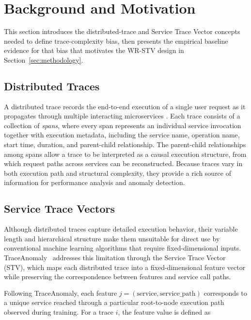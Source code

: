 \documentclass[informatics,article,submit,moreauthors]{Definitions/mdpi}
\newcommand{\rev}[1]{{\color{revisionblue}#1}}
\begin{document}

\section{Background and Motivation}
\label{sec:background}

\rev{This section introduces the distributed-trace and Service Trace Vector
concepts needed to define trace-complexity bias, then presents the
empirical baseline evidence for that bias that motivates the WR-STV
design in Section~\ref{sec:methodology}.}

\subsection{Distributed Traces}

A distributed trace records the end-to-end execution of a single user
request as it propagates through multiple interacting microservices
\cite{sigelman2010dapper}. Each trace consists of a collection of
\emph{spans}, where every span represents an individual service
invocation together with execution metadata, including the service name,
operation name, start time, duration, and parent-child relationship. The
parent-child relationships among spans allow a trace to be interpreted as
a causal execution structure, from which request paths across services
can be reconstructed. Because traces vary in both execution path and
structural complexity, they provide a rich source of information for
performance analysis and anomaly detection.

\subsection{Service Trace Vectors}

Although distributed traces capture detailed execution behavior, their
variable length and hierarchical structure make them unsuitable for
direct use by conventional machine learning algorithms that require
fixed-dimensional inputs. TraceAnomaly~\cite{liu2020traceanomaly}
addresses this limitation through the Service Trace Vector (STV), which
maps each distributed trace into a fixed-dimensional feature vector while
preserving the correspondence between features and service call paths.

Following TraceAnomaly, each feature
$j=(\mathrm{service},\mathrm{service\_path})$ corresponds to a unique service reached through a particular root-to-node execution path observed during training.
For a trace \(i\), the feature value is defined as
\end{document}

